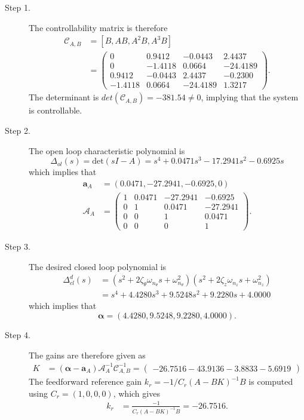 \begin{description}
\item[Step 1.] 
The controllability matrix is therefore
\begin{align*}
\mathcal{C}_{A,B} &= [B, AB, A^2B, A^3B] \\
	&= \begin{pmatrix}           
	0 &   0.9412 &  -0.0443  &  2.4437 \\
    0  & -1.4118 &   0.0664 & -24.4189 \\
    0.9412  & -0.0443 &   2.4437 &  -0.2300 \\
   -1.4118  &  0.0664 & -24.4189 & 1.3217 \end{pmatrix}.
\end{align*}
The determinant is $det(\mathcal{C}_{A,B})=-381.54\neq 0$, implying that the system is controllable.  
\item[Step 2.] The open loop characteristic polynomial is
\[
\Delta_{ol}(s)=\text{det}(sI-A) = s^4 + 0.0471 s^3 - 17.2941 s^2 - 0.6925 s
\]
which implies that
\begin{align*}
\mathbf{a}_A &= (0.0471, -27.2941, -0.6925, 0) \\
\mathcal{A}_A &= \begin{pmatrix} 
1 & 0.0471 & -27.2941 & -0.6925 \\ 0 & 1 & 0.0471 & -27.2941 \\ 0 & 0 & 1 & 0.0471 \\ 0 & 0 & 0 & 1
\end{pmatrix}.
\end{align*}

\item[Step 3.] The desired closed loop polynomial is
\begin{align*}
\Delta_{cl}^d(s) &= (s^2+2\zeta_{\theta}\omega_{n_\theta} s + \omega_{n_\theta}^2)(s^2+2\zeta_{z}\omega_{n_z} s + \omega_{n_z}^2) \\
&=s^4 + 4.4280 s^3 + 9.5248 s^2 + 9.2280 s + 4.0000       
\end{align*}
which implies that
\[
\boldsymbol{\alpha} = (4.4280, 9.5248, 9.2280, 4.0000).
\]

\item[Step 4.]
The gains are therefore given as
\begin{align*}
K &= (\boldsymbol{\alpha}-\mathbf{a}_A)\mathcal{A}_A^{-1}\mathcal{C}_{A,B}^{-1} 
= \begin{pmatrix} -26.7516  -43.9136   -3.8833   -5.6919 \end{pmatrix}
\end{align*}
The feedforward reference gain $k_r=-1/C_r(A-BK)^{-1}B$ is computed using $C_r=(1,0,0,0)$, which gives
\begin{align*}
k_r &= \frac{-1}{C_r(A-BK)^{-1}B} 
  = -26.7516.
\end{align*}
\end{description}

